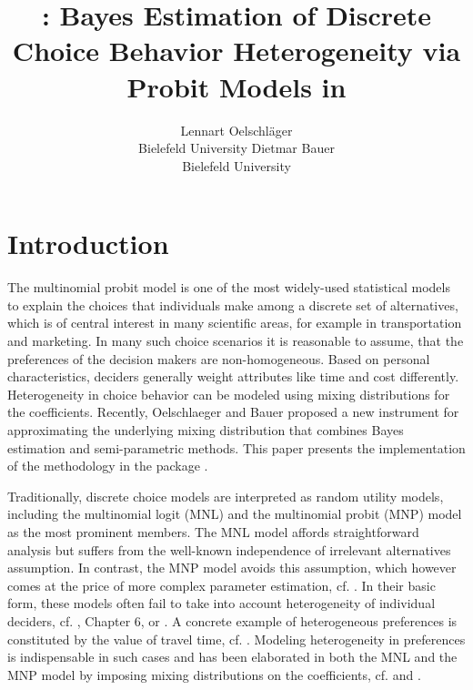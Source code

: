 \documentclass[article]{jss}
\author{Lennart Oelschl\"ager \\Bielefeld University \And Dietmar Bauer\\Bielefeld University}
\title{\pkg{RprobitB}: Bayes Estimation of Discrete Choice Behavior Heterogeneity via Probit Models in \proglang{R}}
\newcommand{\fct}[1]{\code{#1()}}
\begin{document}



\section{Introduction}
\label{sec:intro}

The multinomial probit model is one of the most widely-used statistical models to explain the choices that individuals make among a discrete set of alternatives, which is of central interest in many scientific areas, for example in transportation and marketing. In many such choice scenarios it is reasonable to assume, that the preferences of the decision makers are non-homogeneous. Based on personal characteristics, deciders generally weight attributes like time and cost differently. Heterogeneity in choice behavior can be modeled using mixing distributions for the coefficients. Recently, Oelschlaeger and Bauer proposed a new instrument for approximating the underlying mixing distribution that combines Bayes estimation and semi-parametric methods. This paper presents the implementation of the methodology in the  package .

Traditionally, discrete choice models are interpreted as random utility models, including the multinomial logit (MNL) and the multinomial probit (MNP) model as the most prominent members. The MNL model affords straightforward analysis but suffers from the well-known independence of irrelevant alternatives assumption. In contrast, the MNP model avoids this assumption, which however comes at the price of more complex parameter estimation, cf. \cite{Train:09}. In their basic form, these models often fail to take into account heterogeneity of individual deciders, cf. \cite{Train:09}, Chapter 6, or \cite{Train:16}. A concrete example of heterogeneous preferences is constituted by the value of travel time, cf. \cite{Cirillo:06}. Modeling heterogeneity in preferences is indispensable in such cases and has been elaborated in both the MNL and the MNP model by imposing mixing distributions on the coefficients, cf. \cite{Train:09} and \cite{Bhat:11}.
\end{document}
